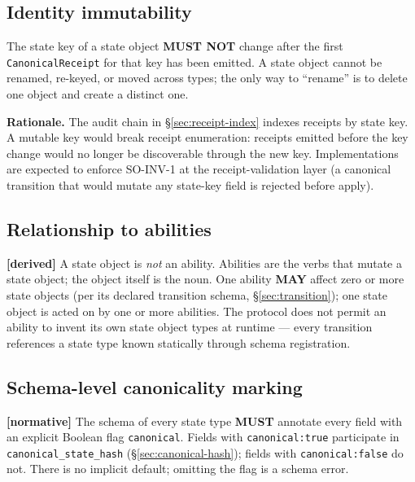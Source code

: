 \documentclass[11pt,a4paper]{article}
\newcommand{\normsv}{\textcolor{normativecolor}{\textbf{[normative]}}\xspace}
\newcommand{\derived}{\textcolor{derivedcolor}{\textbf{[derived]}}\xspace}
\theoremstyle{definition}
\begin{document}
\subsection{Identity immutability}
\label{sec:identity-immutability}

\begin{invariant}[SO-INV-1]
The state key of a state object \textbf{MUST NOT} change after the
first \texttt{CanonicalReceipt} for that key has been emitted.
A state object cannot be renamed, re-keyed, or moved across types;
the only way to ``rename'' is to delete one object and create a
distinct one.
\end{invariant}

\textbf{Rationale.} The audit chain in \S\ref{sec:receipt-index}
indexes receipts by state key. A mutable key would break receipt
enumeration: receipts emitted before the key change would no
longer be discoverable through the new key. Implementations are
expected to enforce SO-INV-1 at the receipt-validation layer (a
canonical transition that would mutate any state-key field is
rejected before apply).

\subsection{Relationship to abilities}

\derived{} A state object is \emph{not} an ability. Abilities are
the verbs that mutate a state object; the object itself is the
noun. One ability \textbf{MAY} affect zero or more state objects
(per its declared transition schema, \S\ref{sec:transition}); one
state object is acted on by one or more abilities. The protocol
does not permit an ability to invent its own state object types
at runtime --- every transition references a state type known
statically through schema registration.

\subsection{Schema-level canonicality marking}
\label{sec:canonicality-marking}

\normsv{}
The schema of every state type \textbf{MUST} annotate every field
with an explicit Boolean flag \texttt{canonical}. Fields with
\texttt{canonical:true} participate in
\texttt{canonical\_state\_hash} (\S\ref{sec:canonical-hash}); fields
with \texttt{canonical:false} do not. There is no implicit default;
omitting the flag is a schema error.
\end{document}

